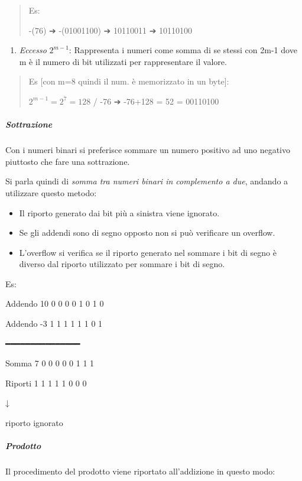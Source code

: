 \begin{quote}
Es:

-(76) ➔ -(01001100) ➔ 10110011 ➔ 10110100
\end{quote}

\begin{enumerate}
\def\labelenumi{\arabic{enumi}.}
\setcounter{enumi}{3}
\item
  \emph{Eccesso} \(2^{m - 1}\): Rappresenta i numeri come somma di se
  stessi con 2m-1 dove m è il numero di bit utilizzati per rappresentare
  il valore.
\end{enumerate}

\begin{quote}
Es {[}con m=8 quindi il num. è memorizzato in un byte{]}:

\(2^{m - 1} = 2^{7} = 128\) / -76 ➔ -76+128 = 52 = 00110100
\end{quote}

\subparagraph{\texorpdfstring{\emph{Sottrazione}}{Sottrazione}}\label{sottrazione}

Con i numeri binari si preferisce sommare un numero positivo ad uno
negativo piuttosto che fare una sottrazione.

Si parla quindi di \emph{somma tra numeri binari in complemento a due},
andando a utilizzare questo metodo:

\begin{itemize}
\item
  Il riporto generato dai bit più a sinistra viene ignorato.
\item
  Se gli addendi sono di segno opposto non si può verificare un
  overflow.
\item
  L'overflow si verifica se il riporto generato nel sommare i bit di
  segno è diverso dal riporto utilizzato per sommare i bit di segno.
\end{itemize}

Es:

Addendo 10 0 0 0 0 1 0 1 0

Addendo -3 1 1 1 1 1 1 0 1

━━━━━━━━━━━━━━━

Somma 7 0 0 0 0 0 1 1 1

Riporti 1 1 1 1 1 0 0 0

↓

riporto ignorato

\subparagraph{\texorpdfstring{\emph{Prodotto}}{Prodotto}}\label{prodotto}

Il procedimento del prodotto viene riportato all'addizione in questo
modo:

